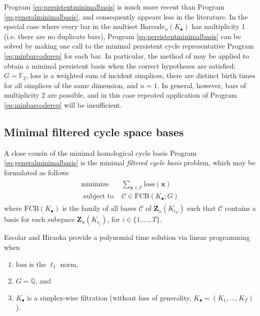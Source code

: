 \documentclass[utf8]{formatting_stuff/frontiersFPHY}
\newcommand{\Q}{\mathbb{Q}}
\newcommand{\field}{\mathbb{F}}
\newcommand{\Cycles}[0]{\mathbf{Z}}
\newcommand{\optimalrep}{\mathbf{x}}
\newcommand{\barcode}{\mathrm{Barcode}}
\newcommand{\loss}{\mathrm{loss}}
\newcommand{\fcyclebasis}{\mathcal{C}}
\newcommand{\setoffilteredcyclebases}{\mathrm{FCB}}
\newcommand{\pr}{Program }
\theoremstyle{plain}
\theoremstyle{definition}
\begin{document}
\pr \eqref{eq:persistentminimalbasis} is much more recent than \pr \eqref{eq:generalminimalbasis}, and consequently appears less in the literature. In the special case where every bar in the multiset $\barcode_n(K_\bullet)$ has multiplicity 1 (i.e. there are no duplicate bars), \pr \eqref{eq:persistentminimalbasis} can be solved by making one call to the minimal persistent cycle representative \pr \eqref{eq:minbarcoderep} for each bar.   In particular, the method of \cite{chenquantifying} may be applied to obtain a minimal persistent basis when the correct hypotheses are satisfied: $G = \field_2$, loss is a weighted sum of incident simplices, there are distinct birth times for all simplices of the same dimension, and $n=1$. In general, however, bars of multiplicity 2 are possible, and in this case repeated application of \pr \eqref{eq:minbarcoderep} will be insufficient.  

\subsection{Minimal filtered cycle space bases}

A close cousin of the minimal homological cycle basis \pr \eqref{eq:generalminimalbasis} is the minimal \emph{filtered cycle basis} problem, which may be formulated as  follows
\begin{align}
   \begin{split}
    \text{minimize } & \textstyle \sum_{\optimalrep \in \fcyclebasis} \loss(\optimalrep) \\
    \text{ subject to } & \fcyclebasis \in \setoffilteredcyclebases(K_\bullet ; G)
   \end{split}
   \label{eq:filteredminimalbasis}
\end{align}
where $\setoffilteredcyclebases(K_\bullet)$ is the family of all bases $\fcyclebasis$ of $\Cycles_n(K_{\epsilon_T})$ such that $\fcyclebasis$ contains a basis for each  subspace $\Cycles_n(K_{\epsilon_i})$, for $i \in \{1, \ldots, T\}$.  

Escolar and Hiraoka \cite{Escolar2016} provide a polynomial time solution via linear programming when
    \begin{enumerate}
        \item $\loss$ is the $\ell_1$ norm,
        \item $G = \Q$, and
        \item $K_\bullet$ is a simplex-wise filtration (without loss of generality, $K_\bullet = (K_1, \ldots, K_T)$).
    \end{enumerate}
\end{document}
